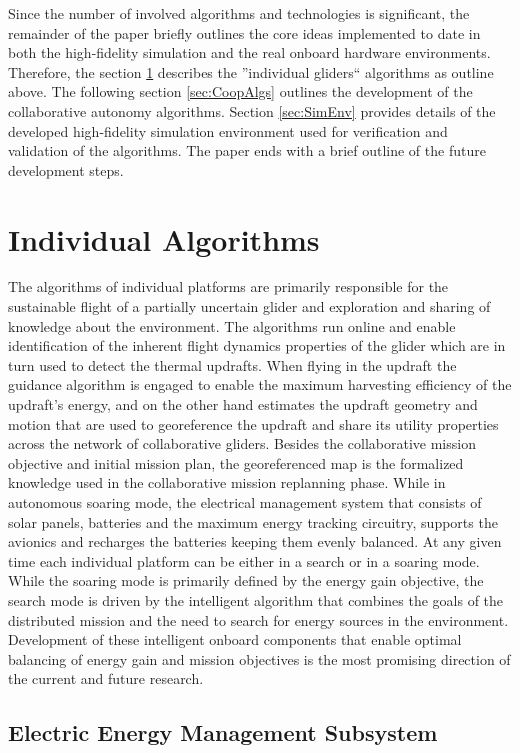 \documentclass{ifacconf}
\begin{document}
Since the number of involved algorithms and technologies is significant, the remainder of the paper briefly outlines the core ideas implemented to date in both the high-fidelity simulation and the real onboard hardware environments. Therefore, the section \ref{sec:IndAlgs} describes the ''individual gliders`` algorithms as outline above. The following section \ref{sec:CoopAlgs}  outlines the development of the collaborative autonomy algorithms. Section \ref{sec:SimEnv} provides details of the developed high-fidelity simulation environment used for verification and validation of the algorithms. The paper ends with a brief outline of the future development steps.

\section{Individual Algorithms}
\label{sec:IndAlgs}

The algorithms of individual platforms are primarily responsible for the sustainable flight of a partially uncertain glider and exploration and sharing of knowledge about the environment. The algorithms run online and enable identification of the inherent flight dynamics properties of the glider which are in turn used to detect the thermal updrafts. When flying in the updraft the guidance algorithm is engaged to enable the maximum harvesting efficiency of the updraft's energy, and on the other hand estimates the updraft geometry and motion that are used to georeference the updraft and share its utility properties across the network of collaborative gliders. Besides the collaborative mission objective and initial mission plan, the georeferenced map is the formalized knowledge used in the collaborative mission replanning phase. While in autonomous soaring mode, the electrical management system that consists of solar panels, batteries and the maximum energy tracking circuitry, supports the avionics and recharges the batteries keeping them evenly balanced. At any given time each individual platform can be either in a search or in a soaring mode. While the soaring mode is primarily defined by the energy gain objective, the search mode is driven by the intelligent algorithm that combines the goals of the distributed mission and the need to search for energy sources in the environment. Development of these intelligent onboard components that enable optimal balancing of energy gain and mission objectives is the most promising direction of the current and future research.

\subsection{Electric Energy Management Subsystem}
\label{subsec:Electric}
\end{document}
